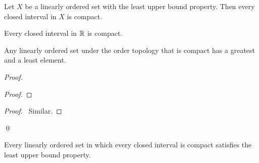 \begin{corollary}
    Let $X$ be a linearly ordered set with the least upper bound property. Then every closed interval in $X$ is compact.
\end{corollary}

\begin{corollary}
    Every closed interval in $\mathbb{R}$ is compact.
\end{corollary}

\begin{theorem}
    Any linearly ordered set under the order topology that is compact has
    a greatest and a least element.
\end{theorem}

\begin{proof}
    \pf
    \begin{proof}
    \end{proof}
    \begin{proof}
        \pf\ Similar.
    \end{proof}
    \qed
\end{proof}

\begin{proposition}
    Every linearly ordered set in which every closed interval is compact
    satisfies the least upper bound property.
\end{proposition}

